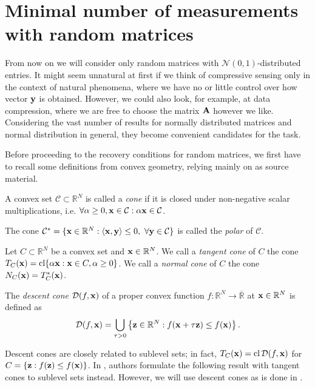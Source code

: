 \section{Minimal number of measurements with random matrices}

From now on we will consider only random matrices with $\mathcal{N}(0,1)$-distributed entries.
It might seem unnatural at first if we think of compressive sensing only in the context of natural phenomena, where we have no
or little control over how vector $\mathbf{y}$ is obtained.
However, we could also look, for example, at data compression, where we are free to choose the matrix $\mathbf{A}$ however we like.
Considering the vast number of results for normally distributed matrices and normal distribution in general,
they become convenient candidates for the task.

Before proceeding to the recovery conditions for random matrices, we first have to recall some definitions from convex geometry,
relying mainly on \cite{rockafellar} as source material.

\begin{definition}
    A convex set $\mathcal{C} \subset \mathbb{R}^N$ is called a \textit{cone} if it is closed under non-negative scalar multiplications, i.e.
    $\forall \alpha \geq 0, \mathbf{x} \in \mathcal{C}: \alpha \mathbf{x} \in \mathcal{C}$.

    The cone $\mathcal{C}^* = \{ \mathbf{x} \in \mathbb{R}^N : \left< \mathbf{x}, \mathbf{y} \right> \leq 0, \ \forall \mathbf{y} \in \mathcal{C} \}$
    is called the \textit{polar} of $\mathcal{C}$.
\end{definition}

\begin{definition}
    Let $C \subset \mathbb{R}^N$ be a convex set and $\mathbf{x} \in \mathbb{R}^N$.
    We call a \textit{tangent cone} of $C$ the cone $T_C(\mathbf{x}) = \operatorname{cl}\{\alpha\mathbf{x}: \mathbf{x} \in C, \alpha \geq 0  \} $.
    We call a \textit{normal cone} of $C$ the cone $N_C(\mathbf{x}) = T_C^*(\mathbf{x})$.
\end{definition}

\begin{definition}
    The \textit{descent cone} $\mathcal{D}(f, \mathbf{x}) $ of a proper convex function $f: \mathbb{R}^N \rightarrow \overline{\mathbb{R}}$
    at $\mathbf{x} \in \mathbb{R}^N$ is defined as $$\mathcal{D}(f, \mathbf{x}) = \bigcup_{\tau > 0} \left\{ \mathbf{z} \in \mathbb{R}^N: f(\mathbf{x}+\tau \mathbf{z}) \leq f(\mathbf{x}) \right\}. $$
\end{definition}

\begin{remark}
    Descent cones are closely related to sublevel sets; in fact, $T_C(\mathbf{x}) = \operatorname{cl} \mathcal{D}(f, \mathbf{x})$
    for $C = \{\mathbf{z}: f(\mathbf{z}) \leq f(\mathbf{x})\}$.
    In \cite{convexgeom}, authors formulate the following result with tangent cones to sublevel sets instead.
    However, we will use descent cones as is done in \cite{lote}.
\end{remark}

